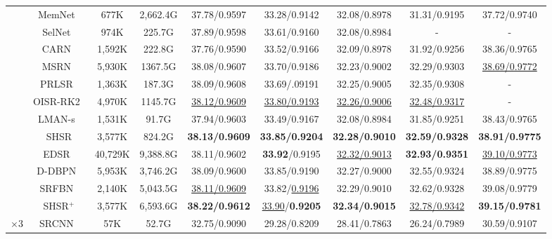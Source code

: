 \documentclass[manuscript,screen]{acmart}
\begin{document}
\begin{table*}[t]
\begin{tabular}{|c|c|c|c|c|c|c|c|c|}
		&MemNet~\cite{memnet_iccv2017}&677K&2,662.4G& 
		37.78/0.9597& 33.28/0.9142& 32.08/0.8978& 31.31/0.9195& 37.72/0.9740 \\
		
		&SelNet~\cite{selnet_cvprw2017}&974K&225.7G& 
		37.89/0.9598& 33.61/0.9160& 32.08/0.8984& - &  - \\
		
		&CARN~\cite{carn_eccv2018}&1,592K&222.8G& 
		37.76/0.9590& 33.52/0.9166& 32.09/0.8978& 31.92/0.9256& 38.36/0.9765\\
		
		&MSRN~\cite{msrn_eccv2018}& 5,930K& 1367.5G& 
		38.08/0.9607& 33.70/0.9186& 32.23/0.9002& 32.29/0.9303& \underline{38.69/0.9772} \\
		
		&PRLSR~\cite{prlsr_icassp2020}& 1,363K& 187.3G&
		38.09/0.9608& 33.69/.09191& 32.25/0.9005& 32.35/0.9308& - \\
		
		&OISR-RK2~\cite{oisr_cvpr2019}& 4,970K& 1145.7G&
		\underline{38.12/0.9609}& \underline{33.80/0.9193}& \underline{32.26/0.9006}& \underline{32.48/0.9317}& - \\
		
		&LMAN-s~\cite{lman_tob2020}& 1,531K& 91.7G&
		37.94/0.9603& 33.49/0.9167& 32.08/0.8984& 31.85/0.9251& 38.43/0.9765 \\
		
		&SHSR& 3,577K& 824.2G& 
		\textbf{38.13/0.9609}& \textbf{33.85/0.9204}& \textbf{32.28/0.9010}& \textbf{32.59/0.9328}& \textbf{38.91/0.9775} \\
		
		\cline{2-9}
		
		&EDSR~\cite{edsr_cvpr2017}&40,729K& 9,388.8G& 
		38.11/0.9602& \textbf{33.92}/0.9195& \underline{32.32/0.9013}& \textbf{32.93/0.9351}& \underline{39.10/0.9773}\\
		
		&D-DBPN~\cite{dbpn_pami2020}& 5,953K& 3,746.2G& 
		38.09/0.9600& 33.85/0.9190& 32.27/0.9000& 32.55/0.9324& 38.89/0.9775\\
		
		&SRFBN~\cite{srfbn_cvpr2019}& 2,140K& 5,043.5G& 
		\underline{38.11/0.9609}& 33.82/\underline{0.9196}& 32.29/0.9010& 32.62/0.9328& 39.08/0.9779\\
		


		&SHSR$^+$& 3,577K& 6,593.6G&\textbf{38.22/0.9612}& \underline{33.90}/\textbf{0.9205}& \textbf{32.34/0.9015}& \underline{32.78/0.9342}& \textbf{39.15/0.9781} \\
		\hline
\hline
		\multirow{16}{*}{$\times3$}& SRCNN~\cite{srcnn_pami2016} &57K &52.7G & 
		32.75/0.9090& 29.28/0.8209& 28.41/0.7863& 26.24/0.7989& 30.59/0.9107\\
		

\end{tabular}
\end{table*}
\end{document}

